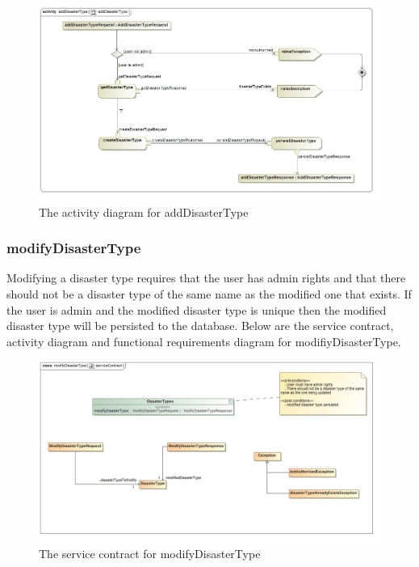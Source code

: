 \begin{figure}[H]
	\centering
	\includegraphics[width=1.0\textwidth]{../images/funcReq/addDisasterTypeActivityDiagram.jpg}
	\caption{The activity diagram for addDisasterType \label{overflow}}
\end{figure}

\subsubsection{modifyDisasterType}

Modifying a disaster type requires that the user has admin rights and that there should not be a disaster type of the same name as the modified one that exists. If the user is admin and the modified disaster type is unique then the modified disaster type will be persisted to the database. Below are the service contract, activity diagram and functional requirements diagram for modifiyDisasterType.

\begin{figure}[H]
	\centering
	\includegraphics[width=1.0\textwidth]{../images/funcReq/modifyDisasterTypeServiceContract.jpg}
	\caption{The service contract for modifyDisasterType \label{overflow}}
\end{figure}

